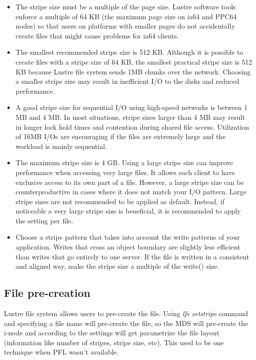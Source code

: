 \documentclass{article}
\begin{document}
\begin{itemize}
    \item The stripe size must be a multiple of the page size. Lustre software tools enforce a multiple of 64 KB (the maximum page size on ia64 and PPC64 nodes) so that users on platforms with smaller pages do not accidentally create files that might cause problems for ia64 clients.

    \item The smallest recommended stripe size is 512 KB. Although it is possible to create files with a stripe size of 64 KB, the smallest practical stripe size is 512 KB because  Lustre file system sends 1MB chunks over the network. Choosing a smaller stripe size may result in inefficient I/O to the disks and reduced performance.

    \item A good stripe size for sequential I/O using high-speed networks is between 1 MB and 4 MB. In most situations, stripe sizes larger than 4 MB may result in longer lock hold times and contention during shared file access. Utilization of 16MB I/Os are encouraging if the files are extremely large and the workload is mainly sequential.

    \item The maximum stripe size is 4 GB. Using a large stripe size can improve performance when accessing very large files. It allows each client to have exclusive access to its own part of a file. However, a large stripe size can be counterproductive in cases where it does not match your I/O pattern. Large stripe sizes are not recommended to be applied as default. Instead, if noticeable a very large stripe size is beneficial, it is recommended to apply the setting per file.

    \item Choose a stripe pattern that takes into account the write patterns of your application. Writes that cross an object boundary are slightly less efficient than writes that go entirely to one server. If the file is written in a consistent and aligned way, make the stripe size a multiple of the write() size.

\end{itemize}

\subsection{File pre-creation}
Lustre file system allows users to pre-create the file. Using \textit{lfs setstripe} command and specifying a file name will pre-create the file, so the MDS will pre-create the i-node and according to the settings will get parametrize the file layout (information like number of stripes, stripe size, etc). This used to be one technique when PFL wasn't available. 
\end{document}
